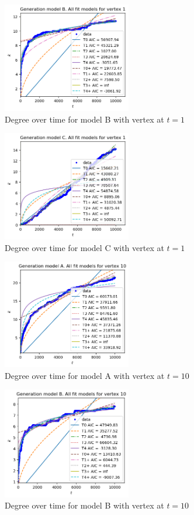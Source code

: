 \documentclass[a4paper]{article}
\begin{document}
%
\begin{figure}[H]
    \centering
		\includegraphics[width=0.5\textwidth]{modelB/all_dt1.png}
		\caption{Degree over time for model B with vertex at $t=1$}
\end{figure}
%
\begin{figure}[H]
		\centering
		\includegraphics[width=0.5\textwidth]{modelC/all_dt1.png}
		\caption{Degree over time for model C with vertex at $t=1$}
\end{figure}
%
\begin{figure}[H]
    \centering
		\includegraphics[width=0.5\textwidth]{modelA/all_dt10.png}
		\caption{Degree over time for model A with vertex at $t=10$}
\end{figure}
%
\begin{figure}[H]
    \centering
		\includegraphics[width=0.5\textwidth]{modelB/all_dt10.png}
		\caption{Degree over time for model B with vertex at $t=10$}
\end{figure}
\end{document}
